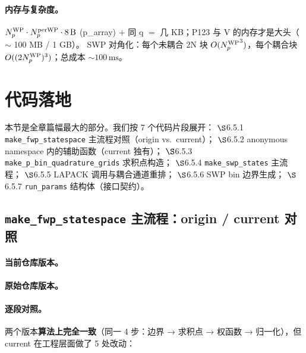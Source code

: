 \paragraph{内存与复杂度。}
\({N_{p}^{\text{WP}}} \cdot N_p^{\rm per WP} \cdot 8\,\text{B}\) (p\_array)
\(+\) 同 q \(=\) 几 KB；P123 与 V 的内存才是大头（\(\sim\) 100 MB / 1 GB）。
SWP 对角化：每个未耦合 2N 块 \(O({N_{p}^{\text{WP}}}^3)\)，每个耦合块
\(O((2{N_{p}^{\text{WP}}})^3)\)；总成本 \(\sim 100\,\mathrm{ms}\)。

\section{代码落地}
\label{sec:ch06-code}

本节是全章篇幅最大的部分。我们按 7 个代码片段展开：
\(\S\)6.5.1 \texttt{make\_fwp\_statespace} 主流程对照（origin vs.~current）；
\(\S\)6.5.2 anonymous namespace 内的辅助函数（current 独有）；
\(\S\)6.5.3 \texttt{make\_p\_bin\_quadrature\_grids} 求积点构造；
\(\S\)6.5.4 \texttt{make\_swp\_states} 主流程；
\(\S\)6.5.5 LAPACK 调用与耦合通道重排；
\(\S\)6.5.6 SWP bin 边界生成；
\(\S\)6.5.7 \texttt{run\_params} 结构体（接口契约）。

\subsection{\texttt{make\_fwp\_statespace} 主流程：origin / current 对照}
\label{subsec:ch06-code-fwp-main}

\paragraph{当前仓库版本。}


\paragraph{原始仓库版本。}


\paragraph{逐段对照。}
两个版本\textbf{算法上完全一致}（同一 4 步：边界 → 求积点 → 权函数 →
归一化），但 current 在工程层面做了 5 处改动：

